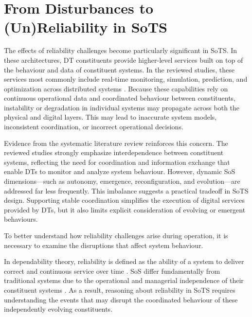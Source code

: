 \section{From Disturbances to (Un)Reliability in SoTS}


The effects of reliability challenges become particularly significant in SoTS. In these architectures, DT constituents provide higher-level services built on top of the behaviour and data of constituent systems. In the reviewed studies, these services most commonly include real-time monitoring, simulation, prediction, and optimization across distributed systems . Because these capabilities rely on continuous operational data and coordinated behaviour between constituents, instability or degradation in individual systems may propagate across both the physical and digital layers. This may lead to inaccurate system models, inconsistent coordination, or incorrect operational decisions.

Evidence from the systematic literature review  reinforces this concern. The reviewed studies strongly emphasize interdependence between constituent systems, reflecting the need for coordination and information exchange that enable DTs to monitor and analyze system behaviour. However, dynamic SoS dimensions---such as autonomy, emergence, reconfiguration, and evolution---are addressed far less frequently. This imbalance suggests a practical tradeoff in SoTS design. Supporting stable coordination simplifies the execution of digital services provided by DTs, but it also limits explicit consideration of evolving or emergent behaviours. 

To better understand how reliability challenges arise during operation, it is necessary to examine the disruptions that affect system behaviour.

In dependability theory, reliability is defined as the ability of a system to deliver correct and continuous service over time \cite{avizienis2001fundamental}. SoS differ fundamentally from traditional systems due to the operational and managerial independence of their constituent systems \cite{maier1998architecting}. As a result, reasoning about reliability in SoTS requires understanding the events that may disrupt the coordinated behaviour of these independently evolving constituents.

